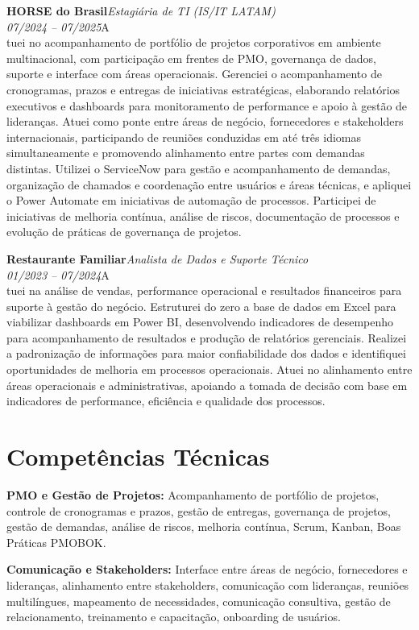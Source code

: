 \documentclass[11pt,a4paper]{article}
\newcommand{\cvrole}[4]{%
  \vspace{4pt}%
  {\bfseries\color{accentcolor}#1}\hfill{\itshape #2}\\[-2pt]%
  {\itshape #3}\hfill #4\\[6pt]%
}
\begin{document}
\cvrole{HORSE do Brasil}{Estagiária de TI (IS/IT LATAM)}{07/2024 -- 07/2025}

Atuei no acompanhamento de portfólio de projetos corporativos em ambiente multinacional, com participação em frentes de PMO, governança de dados, suporte e interface com áreas operacionais. Gerenciei o acompanhamento de cronogramas, prazos e entregas de iniciativas estratégicas, elaborando relatórios executivos e dashboards para monitoramento de performance e apoio à gestão de lideranças. Atuei como ponte entre áreas de negócio, fornecedores e stakeholders internacionais, participando de reuniões conduzidas em até três idiomas simultaneamente e promovendo alinhamento entre partes com demandas distintas. Utilizei o ServiceNow para gestão e acompanhamento de demandas, organização de chamados e coordenação entre usuários e áreas técnicas, e apliquei o Power Automate em iniciativas de automação de processos. Participei de iniciativas de melhoria contínua, análise de riscos, documentação de processos e evolução de práticas de governança de projetos.

\cvrole{Restaurante Familiar}{Analista de Dados e Suporte Técnico}{01/2023 -- 07/2024}

Atuei na análise de vendas, performance operacional e resultados financeiros para suporte à gestão do negócio. Estruturei do zero a base de dados em Excel para viabilizar dashboards em Power BI, desenvolvendo indicadores de desempenho para acompanhamento de resultados e produção de relatórios gerenciais. Realizei a padronização de informações para maior confiabilidade dos dados e identifiquei oportunidades de melhoria em processos operacionais. Atuei no alinhamento entre áreas operacionais e administrativas, apoiando a tomada de decisão com base em indicadores de performance, eficiência e qualidade dos processos.

\section{Competências Técnicas}

\textbf{PMO e Gestão de Projetos:} Acompanhamento de portfólio de projetos, controle de cronogramas e prazos, gestão de entregas, governança de projetos, gestão de demandas, análise de riscos, melhoria contínua, Scrum, Kanban, Boas Práticas PMOBOK.

\textbf{Comunicação e Stakeholders:} Interface entre áreas de negócio, fornecedores e lideranças, alinhamento entre stakeholders, comunicação com lideranças, reuniões multilíngues, mapeamento de necessidades, comunicação consultiva, gestão de relacionamento, treinamento e capacitação, onboarding de usuários.
\end{document}
